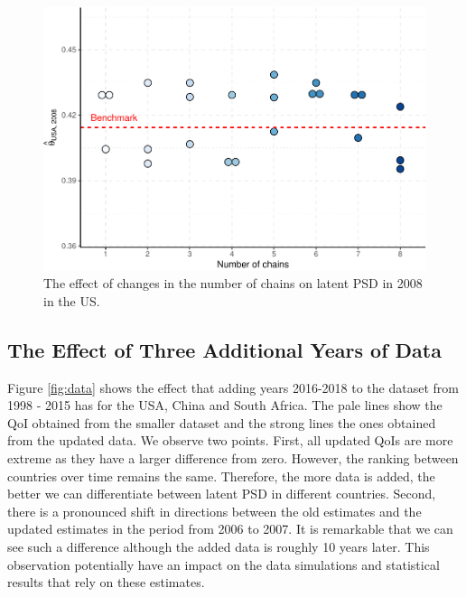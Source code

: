 \documentclass[12pt,english,a4paper,oneside]{article}
\theoremstyle{definition}
\theoremstyle{definition}
\theoremstyle{definition}
\theoremstyle{definition}
\theoremstyle{remark}
\begin{document}
\begin{figure}[H]
\includegraphics[width=\textwidth]{figs/chain-1} \caption[The effect of changes in the number of chains on latent PSD in 2008 in the US]{The effect of changes in the number of chains on latent PSD in 2008 in the US.}\label{fig:chain}
\end{figure}

\hypertarget{the-effect-of-three-additional-years-of-data}{%
\subsection{The Effect of Three Additional Years of Data}\label{the-effect-of-three-additional-years-of-data}}

Figure \ref{fig:data} shows the effect that adding years 2016-2018 to the dataset from 1998 - 2015 has for the USA, China and South Africa. The pale lines show the QoI obtained from the smaller dataset and the strong lines the ones obtained from the updated data. We observe two points. First, all updated QoIs are more extreme as they have a larger difference from zero. However, the ranking between countries over time remains the same. Therefore, the more data is added, the better we can differentiate between latent PSD in different countries. Second, there is a pronounced shift in directions between the old estimates and the updated estimates in the period from 2006 to 2007. It is remarkable that we can see such a difference although the added data is roughly 10 years later. This observation potentially have an impact on the data simulations and statistical results that rely on these estimates.
\end{document}
